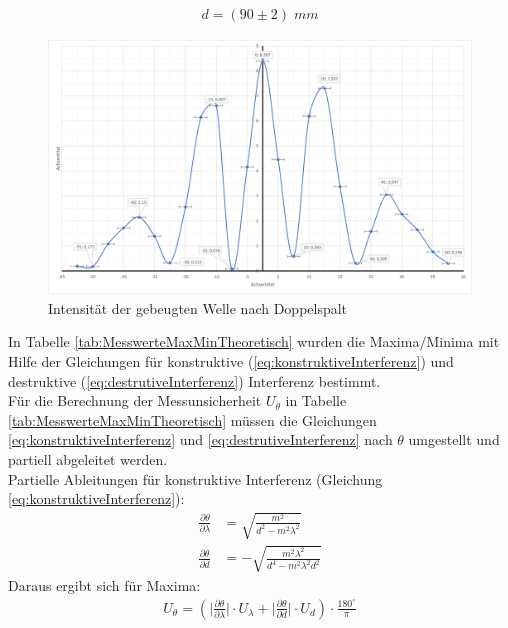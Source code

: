 \documentclass[a4paper]{scrartcl}
\numberwithin{equation}{subsection}
\begin{document}
\begin{align*}
d = (90\pm 2)\; mm
\end{align*}

\begin{figure}[H]
\includegraphics[width=13cm]{Diagramm_Doppelspalt}
\centering
\caption{Intensität der gebeugten Welle nach Doppelspalt}
\centering
\label{fig:DiagrammDoppelspalt}
\end{figure}

In Tabelle \ref{tab:MesswerteMaxMinTheoretisch} wurden die Maxima/Minima mit Hilfe der Gleichungen für konstruktive (\ref{eq:konstruktiveInterferenz}) und destruktive (\ref{eq:destrutiveInterferenz}) Interferenz bestimmt.\\
Für die Berechnung der Messunsicherheit $U_{\theta}$ in Tabelle \ref{tab:MesswerteMaxMinTheoretisch} müssen die Gleichungen \ref{eq:konstruktiveInterferenz} und \ref{eq:destrutiveInterferenz} nach $\theta$ umgestellt und partiell abgeleitet werden.\\
Partielle Ableitungen für konstruktive Interferenz (Gleichung \ref{eq:konstruktiveInterferenz}):
\begin{align}
\frac{\partial \theta}{\partial \lambda} &= \sqrt{\frac{m^2}{d^2-m^2\lambda^2}}\\
\frac{\partial \theta}{\partial d} &= - \sqrt{\frac{m^2 \lambda^2}{d^4-m^2\lambda^2d^2}}
\end{align}
Daraus ergibt sich für Maxima:
\begin{align}
U_{\theta} = (\bigg | \frac{\partial \theta}{\partial \lambda} \bigg | \cdot U_{\lambda} + \bigg | \frac{\partial \theta}{\partial d} \bigg | \cdot U_d) \cdot \frac{180 ^\circ}{\pi}
\end{align}
\end{document}
